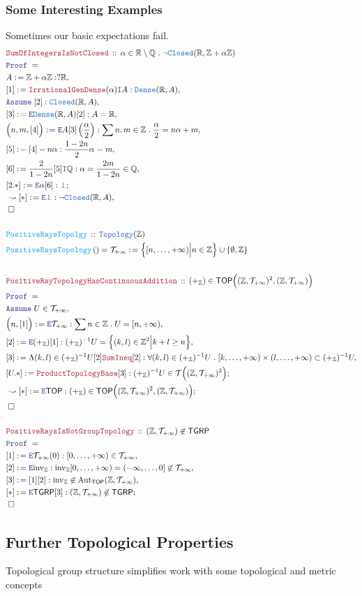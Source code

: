 \documentclass[12pt]{scrartcl}
\newcommand{\TYPE}[1]{\textcolor{NavyBlue}{\mathtt{#1}}}
\newcommand{\FUNC}[1]{\textcolor{Cerulean}{\mathtt{#1}}}
\newcommand{\LOGIC}[1]{\textcolor{Blue}{\mathtt{#1}}}
\newcommand{\THM}[1]{\textcolor{Maroon}{\mathtt{#1}}}
\renewcommand{\.}{\; . \;}
\newcommand{\de}{: \kern 0.1pc =}
\newcommand{\Act}[1]{\left( #1 \right)}
\newcommand{\Theorem}[2]{& \THM{#1} \, :: \, #2 \\ & \Proof = \\ }
\newcommand{\DeclareFunc}[2]{& \FUNC{#1} \, :: \, #2 \\}
\newcommand{\DefineNamedFunc}[4]{&  \FUNC{#1}\Act{#2} = #3 \de #4 \\}
\newcommand{\Page}[1]{ \begin{align*} #1 \end{align*}   }
\newcommand{\Int}{\mathbb{Z} }
\newcommand{\Reals}{\mathbb{R} }
\newcommand{\Rats}{\mathbb{Q} }
\newcommand{\Aut}{\mathrm{Aut}}
\newcommand{\Say}[3]{& #1 \de #2 : #3, \\}
\newcommand{\Conclude}[3]{& #1 \de #2 : #3; \\}
\newcommand{\Derive}[3]{& \leadsto #1 \de #2 : #3, \\}
\newcommand{\DeriveConclude}[3]{& \leadsto #1 \de #2 : #3 ; \\}
\newcommand{\Assume}[2]{& \LOGIC{Assume} \; #1 : #2, \\}
\newcommand{\AssumeIn}[2]{& \LOGIC{Assume} \; #1 \in #2, \\}
\newcommand{\Intro}{\LOGIC{I}}
\newcommand{\Elim}{\LOGIC{E}}
\newcommand{\QED}{\; \square}
\newcommand{\EndProof}{& \QED \\}
\newcommand{\Proof}{\LOGIC{Proof} \; }
\newcommand{\Dense}{\TYPE{Dense}}
\newcommand{\Closed}{\TYPE{Closed}}
\newcommand{\TOP}{\mathsf{TOP}}
\newcommand{\T}{\mathcal{T}}
\newcommand{\inv}{\mathrm{inv}}
\newcommand{\TGRP}{\mathsf{TGRP}}
\begin{document}
\subsubsection{Some Interesting Examples}
Sometimes our basic expectations fail.
\Page{
	\Theorem{SumOfIntegersIsNotClosed}
	{
		\alpha \in \Reals \setminus \Rats  \.
		\neg \Closed(\Reals,\Int + \alpha\Int)
	}
	\Say{A}{\Int + \alpha \Int}{?\Reals}
	\Say{[1]}{\THM{IrrationalGenDense}(\alpha)\Intro A}
	{
		\Dense(\Reals,A)
	}
	\Assume{[2]}{\Closed(\Reals,A)}
	\Say{[3]}{\Elim \Dense(\Reals,A)[2]}{A = \Reals}
	\Say{\Big(n,m,[4]\Big)}{\Elim A [3]\left( \frac{\alpha}{2}\right)}
	{
		\sum n,m \in \Int \.  \frac{\alpha}{2} = n\alpha + m
	}
	\Say{[5]}{[4] - n\alpha}{ \frac{1 - 2n}{2} \alpha = m  }
	\Say{[6]}{\frac{2}{1-2n}[5]\Intro \Rats}{\alpha = \frac{2m}{1-2n} \in \Rats }
	\Conclude{[2.*]}{\Elim \alpha [6]}{\bot}
	\Derive{[*]}{\Elim \bot}{\neg \Closed(\Reals,A)}
	\EndProof
	\\
	\DeclareFunc{PositiveRaysTopolgy}{\TYPE{Topology}(\Int)}
	\DefineNamedFunc{PositiveRaysTopology}{}{\T_{+\infty}}
	{
		\Big\{ [n,\ldots,+\infty) \Big| n \in \Int \Big\} \cup \{\emptyset,\Int\}
	}
	\\
	\Theorem{PositiveRayTopologyHasContinuousAddition}
	{
		(+_\Int) \in \TOP\Big( (\Int,\T_{+\infty})^2,(\Int,\T_{+\infty})\Big)
	}
	\AssumeIn{U}{\T_{+\infty}}
	\Say{\Big(n,[1]\Big)}{\Elim \T_{+\infty}}{
		\sum n \in \Int \. U = [n, + \infty )
	}
	\Say{[2]}{\Elim (+_\Int)[1]}
	{
		(+_\Int)^{-1}U = \Big\{ (k,l) \in \Int^2 \Big|  k + l \ge n   \Big\}		
	}
	\Say{[3]}{\Lambda (k,l) \in (+_\Int)^{-1}U [2]\THM{SumIneq}[2] }
	{
		\forall (k,l) \in (+_\Int)^{-1}U \. 
		[k,\ldots,+\infty) \times (l,\ldots,+\infty) \subset (+_\Int)^{-1}U
	}
	\Conclude{[U.*]}{\THM{ProductTopologyBase}[3]}
	{
		(+_\Int)^{-1}U \in \T\Big( (\Int,\T_{+\infty})^2 \Big)
	}
	\DeriveConclude{[*]}{\Elim \TOP}
	{
		(+_\Int) \in 
		\TOP\Big( (\Int,\T_{+\infty})^2,(\Int,\T_{+\infty})\Big)
	}
	\EndProof
	\\
	\Theorem{PositiveRaysIsNotGroupTopology}
	{
		(\Int,\T_{+\infty}) \not \in \TGRP
	}
	\Say{[1]}{\Elim \T_{+\infty}(0)}{
		[0,\ldots,+\infty)  \in  \T_{+\infty}
	}
	\Say{[2]}{\Elim \inv_\Int}{
		\inv_\Int [0,\ldots,+\infty)
		=  (-\infty, \ldots,0] \not \in \T_{+\infty}
	}
	\Say{[3]}{[1][2]}{\inv_\Int \not \in \Aut_\TOP(\Int,\T_{+\infty})}
	\Conclude{[*]}{\Elim \TGRP [3]}
	{
		(\Int,\T_{+\infty})	\not \in \TGRP
	}
	\EndProof
}
\newpage
\subsection{Further Topological Properties}
Topological group structure simplifies work with some topological and metric concepts
\end{document}
